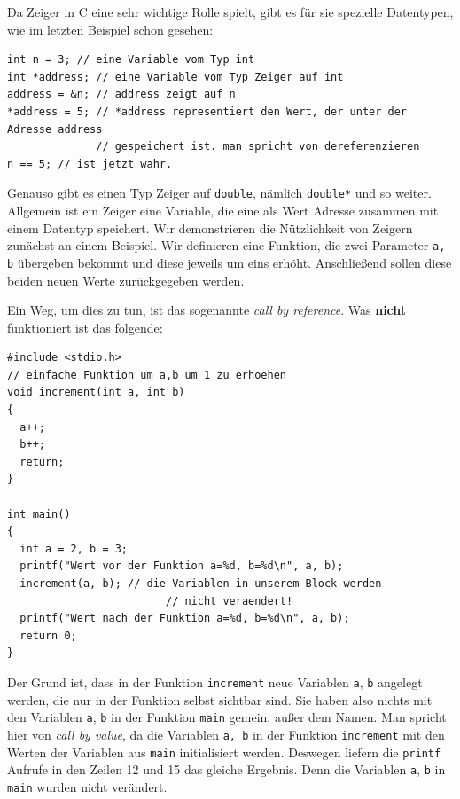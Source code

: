 Da Zeiger in C eine sehr wichtige Rolle spielt, gibt es für sie spezielle Datentypen, wie im letzten Beispiel schon gesehen:
\begin{lstlisting}
int n = 3; // eine Variable vom Typ int
int *address; // eine Variable vom Typ Zeiger auf int
address = &n; // address zeigt auf n
*address = 5; // *address representiert den Wert, der unter der Adresse address
              // gespeichert ist. man spricht von dereferenzieren
n == 5; // ist jetzt wahr.
\end{lstlisting}
Genauso gibt es einen Typ Zeiger auf \verb|double|, nämlich \verb|double*| und so weiter.
Allgemein ist ein Zeiger eine Variable, die eine als Wert Adresse zusammen mit einem Datentyp speichert.
Wir demonstrieren die Nützlichkeit von Zeigern zunächst an einem Beispiel.
Wir definieren eine Funktion, die zwei Parameter \verb|a, b| übergeben bekommt und diese jeweils um eins erhöht.
Anschließend sollen diese beiden neuen Werte zurückgegeben werden.

Ein Weg, um dies zu tun, ist das sogenannte \emph{call by reference}.
Was \textbf{nicht} funktioniert ist das folgende:
\begin{lstlisting}
#include <stdio.h>
// einfache Funktion um a,b um 1 zu erhoehen
void increment(int a, int b)
{
  a++;
  b++;
  return;
}

int main()
{
  int a = 2, b = 3;
  printf("Wert vor der Funktion a=%d, b=%d\n", a, b);
  increment(a, b); // die Variablen in unserem Block werden
                         // nicht veraendert!
  printf("Wert nach der Funktion a=%d, b=%d\n", a, b);
  return 0;
}
\end{lstlisting}
Der Grund ist, dass in der Funktion \verb|increment| neue Variablen \verb|a|, \verb|b| angelegt werden, die nur in der Funktion selbst sichtbar sind.
Sie haben also nichts mit den Variablen \verb|a|, \verb|b| in der Funktion \verb|main| gemein, außer dem Namen.
Man spricht hier von \emph{call by value}, da die Variablen \verb|a, b| in der Funktion \verb|increment| mit den Werten der Variablen aus \verb|main| initialisiert werden.
Deswegen liefern die \verb|printf| Aufrufe in den Zeilen 12 und 15 das gleiche Ergebnis.
Denn die Variablen \verb|a|, \verb|b| in \verb|main| wurden nicht verändert.

